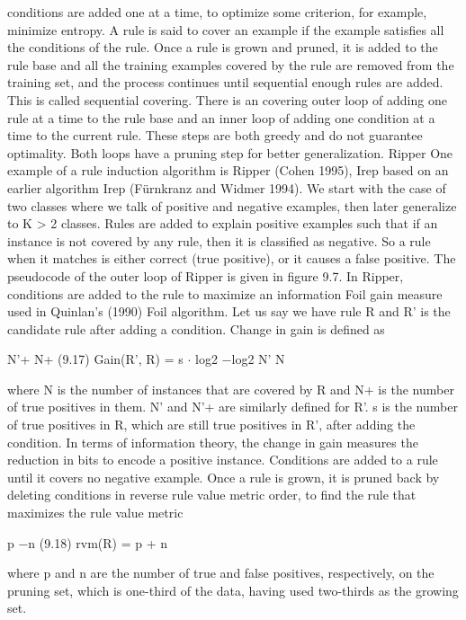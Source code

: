 conditions are added one at a time, to optimize some criterion, for example, minimize entropy. A rule is said to cover an example if the example satisfies all the conditions of the rule. Once a rule is grown and pruned, it is added to the rule base and all the training examples covered by the rule are removed from the training set, and the process continues until sequential enough rules are added. This is called sequential covering. There is an covering outer loop of adding one rule at a time to the rule base and an inner loop of adding one condition at a time to the current rule. These steps are both greedy and do not guarantee optimality. Both loops have a pruning step for better generalization. Ripper One example of a rule induction algorithm is Ripper (Cohen 1995), Irep based on an earlier algorithm Irep (Fürnkranz and Widmer 1994). We start with the case of two classes where we talk of positive and negative examples, then later generalize to K > 2 classes. Rules are added to explain positive examples such that if an instance is not covered by any rule, then it is classified as negative. So a rule when it matches is either correct (true positive), or it causes a false positive. The pseudocode of the outer loop of Ripper is given in figure 9.7. In Ripper, conditions are added to the rule to maximize an information Foil gain measure used in Quinlan’s (1990) Foil algorithm. Let us say we have rule R and R' is the candidate rule after adding a condition. Change in gain is defined as

N'+ N+ (9.17) Gain(R', R) = s $\cdot$ log2 $-$log2 N' N

where N is the number of instances that are covered by R and N+ is the number of true positives in them. N' and N'+ are similarly defined for R'. s is the number of true positives in R, which are still true positives in R', after adding the condition. In terms of information theory, the change in gain measures the reduction in bits to encode a positive instance. Conditions are added to a rule until it covers no negative example. Once a rule is grown, it is pruned back by deleting conditions in reverse rule value metric order, to find the rule that maximizes the rule value metric

p $-$n (9.18) rvm(R) = p + n

where p and n are the number of true and false positives, respectively, on the pruning set, which is one-third of the data, having used two-thirds as the growing set.

